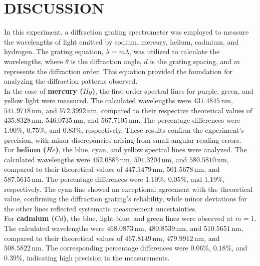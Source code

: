 \documentclass[a4paper,11pt]{article}
\begin{document}
\section*{\center DISCUSSION}
\label{sec:DISCUSSION}

\qquad In this experiment, a diffraction grating spectrometer was employed to measure the wavelengths of light emitted by sodium, mercury, helium, cadmium, and hydrogen. The grating equation, \( \lambda = m \lambda \), was utilized to calculate the wavelengths, where \( \theta \) is the diffraction angle, \( d \) is the grating spacing, and \( m \) represents the diffraction order. This equation provided the foundation for analyzing the diffraction patterns observed.\\

In the case of \textbf{mercury (\(Hg\))}, the first-order spectral lines for purple, green, and yellow light were measured. The calculated wavelengths were \(431.4845 \, \text{nm}\), \(541.9718 \, \text{nm}\), and \(572.3992 \, \text{nm}\), compared to their respective theoretical values of \(435.8328 \, \text{nm}\), \(546.0735 \, \text{nm}\), and \(567.7105 \, \text{nm}\). The percentage differences were \(1.00\%\), \(0.75\%\), and \(0.83\%\), respectively. These results confirm the experiment's precision, with minor discrepancies arising from small angular reading errors.\\

For \textbf{helium (\(He\))}, the blue, cyan, and yellow spectral lines were analyzed. The calculated wavelengths were \(452.0885 \, \text{nm}\), \(501.3204 \, \text{nm}\), and \(580.5810 \, \text{nm}\), compared to their theoretical values of \(447.1479 \, \text{nm}\), \(501.5678 \, \text{nm}\), and \(587.5615 \, \text{nm}\). The percentage differences were \(1.10\%\), \(0.05\%\), and \(1.19\%\), respectively. The cyan line showed an exceptional agreement with the theoretical value, confirming the diffraction grating's reliability, while minor deviations for the other lines reflected systematic measurement uncertainties.\\

For \textbf{cadmium (\(Cd\))}, the blue, light blue, and green lines were observed at \(m=1\). The calculated wavelengths were \(468.0873 \, \text{nm}\), \(480.8539 \, \text{nm}\), and \(510.5651 \, \text{nm}\), compared to their theoretical values of \(467.8149 \, \text{nm}\), \(479.9912 \, \text{nm}\), and \(508.5822 \, \text{nm}\). The corresponding percentage differences were \(0.06\%\), \(0.18\%\), and \(0.39\%\), indicating high precision in the measurements.\\
\end{document}
